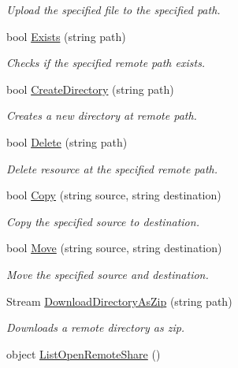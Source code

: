 \begin{DoxyCompactItemize}
\begin{DoxyCompactList}\small\item\em Upload the specified file to the specified path. \end{DoxyCompactList}\item 
bool \hyperlink{classowncloudsharp_1_1_client_a6f2160610e85aa278d235be8ba613bbd}{Exists} (string path)
\begin{DoxyCompactList}\small\item\em Checks if the specified remote path exists. \end{DoxyCompactList}\item 
bool \hyperlink{classowncloudsharp_1_1_client_a7fa222eebf65ff47a05056b2182c1669}{Create\+Directory} (string path)
\begin{DoxyCompactList}\small\item\em Creates a new directory at remote path. \end{DoxyCompactList}\item 
bool \hyperlink{classowncloudsharp_1_1_client_a6465df479d098af428bc9bcdd2edbc7f}{Delete} (string path)
\begin{DoxyCompactList}\small\item\em Delete resource at the specified remote path. \end{DoxyCompactList}\item 
bool \hyperlink{classowncloudsharp_1_1_client_ad20dcb23c0158e491d54401b2809b903}{Copy} (string source, string destination)
\begin{DoxyCompactList}\small\item\em Copy the specified source to destination. \end{DoxyCompactList}\item 
bool \hyperlink{classowncloudsharp_1_1_client_a2ea83b74c926b1ff7a8443f75bf4ebd2}{Move} (string source, string destination)
\begin{DoxyCompactList}\small\item\em Move the specified source and destination. \end{DoxyCompactList}\item 
Stream \hyperlink{classowncloudsharp_1_1_client_aa5b9f5fb73514eeee4242d57605bdcd5}{Download\+Directory\+As\+Zip} (string path)
\begin{DoxyCompactList}\small\item\em Downloads a remote directory as zip. \end{DoxyCompactList}\item 
object \hyperlink{classowncloudsharp_1_1_client_a47f02b74f8beb72a312ff92a07636096}{List\+Open\+Remote\+Share} ()

\end{DoxyCompactItemize}
